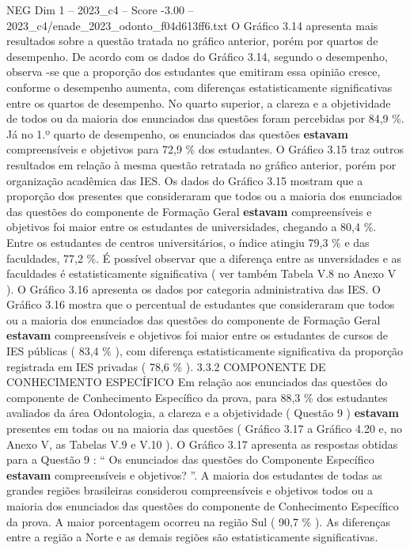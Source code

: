 \begin{textsample}{NEG Dim 1 – 2023\_c4 – Score -3.00 – 2023\_c4/enade\_2023\_odonto\_f04d613ff6.txt}
O Gráfico 3.14 apresenta mais resultados sobre a questão tratada no gráfico anterior, porém por quartos de desempenho.
De acordo com os dados do Gráfico 3.14, segundo o desempenho, observa -se que a proporção dos estudantes que emitiram essa opinião cresce, conforme o desempenho aumenta, com diferenças estatisticamente significativas entre os quartos de desempenho.
No quarto superior, a clareza e a objetividade de todos ou da maioria dos enunciados das questões foram percebidas por 84,9 \%.
Já no 1.º quarto de desempenho, os enunciados das questões \textbf{estavam} compreensíveis e objetivos para 72,9 \% dos estudantes.
O Gráfico 3.15 traz outros resultados em relação à mesma questão retratada no gráfico anterior, porém por organização acadêmica das IES.
Os dados do Gráfico 3.15 mostram que a proporção dos presentes que consideraram que todos ou a maioria dos enunciados das questões do componente de Formação Geral \textbf{estavam} compreensíveis e objetivos foi maior entre os estudantes de universidades, chegando a 80,4 \%.
Entre os estudantes de centros universitários, o índice atingiu 79,3 \% e das faculdades, 77,2 \%.
É possível observar que a diferença entre as unversidades e as faculdades é estatisticamente significativa ( ver também Tabela V.8 no Anexo V ).
O Gráfico 3.16 apresenta os dados por categoria administrativa das IES.
O Gráfico 3.16 mostra que o percentual de estudantes que consideraram que todos ou a maioria dos enunciados das questões do componente de Formação Geral \textbf{estavam} compreensíveis e objetivos foi maior entre os estudantes de cursos de IES públicas ( 83,4 \% ), com diferença estatisticamente significativa da proporção registrada em IES privadas ( 78,6 \% ). 3.3.2 COMPONENTE DE CONHECIMENTO ESPECÍFICO Em relação aos enunciados das questões do componente de Conhecimento Específico da prova, para 88,3 \% dos estudantes avaliados da área Odontologia, a clareza e a objetividade ( Questão 9 ) \textbf{estavam} presentes em todas ou na maioria das questões ( Gráfico 3.17 a Gráfico 4.20 e, no Anexo V, as Tabelas V.9 e V.10 ).
O Gráfico 3.17 apresenta as respostas obtidas para a Questão 9 : “ Os enunciados das questões do Componente Específico \textbf{estavam} compreensíveis e objetivos? ”.
A maioria dos estudantes de todas as grandes regiões brasileiras considerou compreensíveis e objetivos todos ou a maioria dos enunciados das questões do componente de Conhecimento Específico da prova.
A maior porcentagem ocorreu na região Sul ( 90,7 \% ).
As diferenças entre a região a Norte e as demais regiões são estatisticamente significativas.

\end{textsample}
